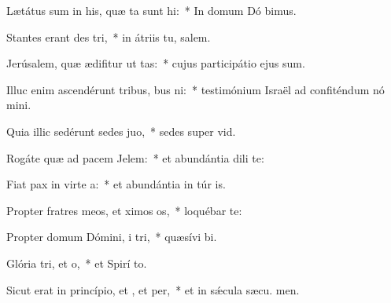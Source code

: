 \item Lætátus sum in his, quæ ta sunt hi:~* In domum Dó bimus.
\item Stantes erant des tri,~* in átriis tu, salem.
\item Jerúsalem, quæ ædifitur ut tas:~* cujus participátio ejus  sum.
\item Illuc enim ascendérunt tribus, bus ni:~* testimónium Israël ad confiténdum nó mini.
\item Quia illic sedérunt sedes  juo,~* sedes super  vid.
\item Rogáte quæ ad pacem  Jelem:~* et abundántia dili te:
\item Fiat pax in virte a:~* et abundántia in túr is.
\item Propter fratres meos, et ximos os,~* loquébar   te:
\item Propter domum Dómini, i tri,~* quæsívi  bi.
\item Glória tri, et o,~* et Spirí to.
\item Sicut erat in princípio, et , et per,~* et in sǽcula sæcu. men.
